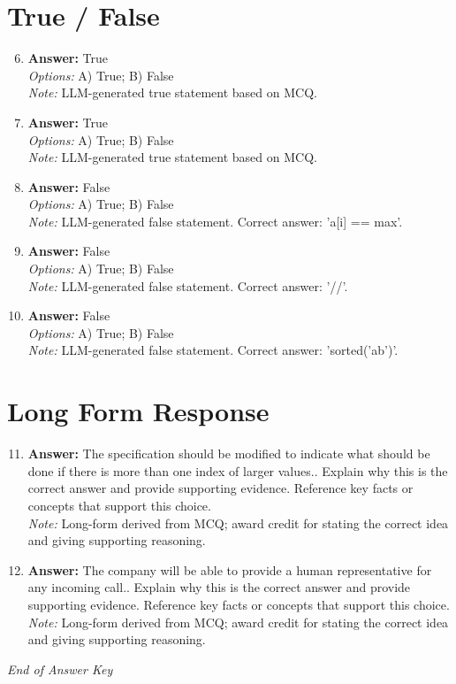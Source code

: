 \documentclass[12pt]{article}
\begin{document}
\section*{True / False}
\begin{enumerate}[label=\arabic*.]
\setcounter{enumi}{5}
\item \textbf{Answer:} True
\\ \textit{Options:} A) True; B) False
\\ \textit{Note:} LLM-generated true statement based on MCQ.
\item \textbf{Answer:} True
\\ \textit{Options:} A) True; B) False
\\ \textit{Note:} LLM-generated true statement based on MCQ.
\item \textbf{Answer:} False
\\ \textit{Options:} A) True; B) False
\\ \textit{Note:} LLM-generated false statement. Correct answer: 'a[i] == max'.
\item \textbf{Answer:} False
\\ \textit{Options:} A) True; B) False
\\ \textit{Note:} LLM-generated false statement. Correct answer: '//'.
\item \textbf{Answer:} False
\\ \textit{Options:} A) True; B) False
\\ \textit{Note:} LLM-generated false statement. Correct answer: 'sorted('ab')'.
\end{enumerate}

\section*{Long Form Response}
\begin{enumerate}[label=\arabic*.]
\setcounter{enumi}{10}
\item \textbf{Answer:} The specification should be modified to indicate what should be done if there is more than one index of larger values.. Explain why this is the correct answer and provide supporting evidence. Reference key facts or concepts that support this choice.
\\ \textit{Note:} Long-form derived from MCQ; award credit for stating the correct idea and giving supporting reasoning.
\item \textbf{Answer:} The company will be able to provide a human representative for any incoming call.. Explain why this is the correct answer and provide supporting evidence. Reference key facts or concepts that support this choice.
\\ \textit{Note:} Long-form derived from MCQ; award credit for stating the correct idea and giving supporting reasoning.
\end{enumerate}

\vfill
\noindent\textit{End of Answer Key}
\end{document}
